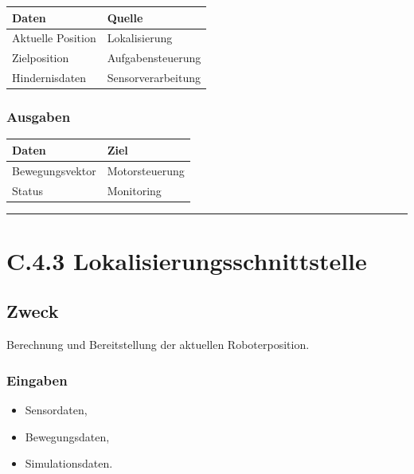 \documentclass[
]{article}
\providecommand{\tightlist}{%
  \setlength{\itemsep}{0pt}\setlength{\parskip}{0pt}}
\begin{document}
\begin{longtable}[]{@{}ll@{}}
\toprule\noalign{}
Daten & Quelle \\
\midrule\noalign{}
\endhead
\bottomrule\noalign{}
\endlastfoot
Aktuelle Position & Lokalisierung \\
Zielposition & Aufgabensteuerung \\
Hindernisdaten & Sensorverarbeitung \\
\end{longtable}

\subsubsection{Ausgaben}\label{ausgaben-1}

\begin{longtable}[]{@{}ll@{}}
\toprule\noalign{}
Daten & Ziel \\
\midrule\noalign{}
\endhead
\bottomrule\noalign{}
\endlastfoot
Bewegungsvektor & Motorsteuerung \\
Status & Monitoring \\
\end{longtable}

\begin{center}\rule{0.5\linewidth}{0.5pt}\end{center}

\section{C.4.3
Lokalisierungsschnittstelle}\label{c.4.3-lokalisierungsschnittstelle}

\subsection{Zweck}\label{zweck-7}

Berechnung und Bereitstellung der aktuellen Roboterposition.

\subsubsection{Eingaben}\label{eingaben-2}

\begin{itemize}
\tightlist
\item
  Sensordaten,
\item
  Bewegungsdaten,
\item
  Simulationsdaten.
\end{itemize}
\end{document}
